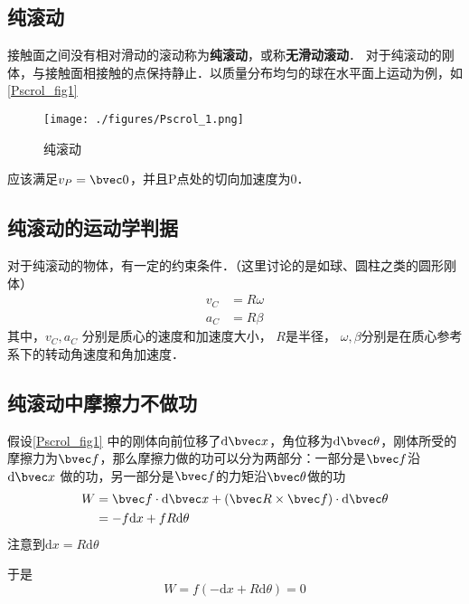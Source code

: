 


\subsection{纯滚动}
接触面之间没有相对滑动的滚动称为\textbf{纯滚动}，或称\textbf{无滑动滚动}．
对于纯滚动的刚体，与接触面相接触的点保持静止．以质量分布均匀的球在水平面上运动为例，如\autoref{Pscrol_fig1}
\begin{figure}[ht]
\centering
\texttt{[image: ./figures/Pscrol\_1.png]}
\caption{纯滚动} \label{Pscrol_fig1}
\end{figure}
应该满足$v_P=\bvec 0$，并且P点处的切向加速度为0．

\subsection{纯滚动的运动学判据}
对于纯滚动的物体，有一定的约束条件．（这里讨论的是如球、圆柱之类的圆形刚体）
\begin{equation}
\begin{aligned}
v_C&=R\omega\\
a_C&=R\beta
\end{aligned}
\end{equation}
其中，$v_C,a_C$
分别是质心的速度和加速度大小，
$R$是半径，
$\omega,\beta$分别是在质心参考系下的转动角速度和角加速度．

\subsection{纯滚动中摩擦力不做功}
假设\autoref{Pscrol_fig1} 中的刚体向前位移了$\mathrm{d}\bvec x$，角位移为$\mathrm{d} \bvec \theta$，刚体所受的摩擦力为$\bvec f$，那么摩擦力做的功可以分为两部分：一部分是$\bvec f$沿$\mathrm{d} \bvec x$ 做的功，另一部分是$\bvec f$的力矩沿$\bvec \theta$做的功
\begin{equation}
\begin{aligned}
W&=\bvec f\cdot\mathrm{d} \bvec x+(\bvec R\times \bvec f)\cdot\mathrm{d} \bvec \theta\\
&=-f\mathrm{d} x+fR\mathrm{d} \theta
\end{aligned}
\end{equation}
注意到$\mathrm{d} x=R\mathrm{d} \theta$

于是\begin{equation}
W=f(-\mathrm{d} x+R\mathrm{d} \theta)=0
\end{equation}
